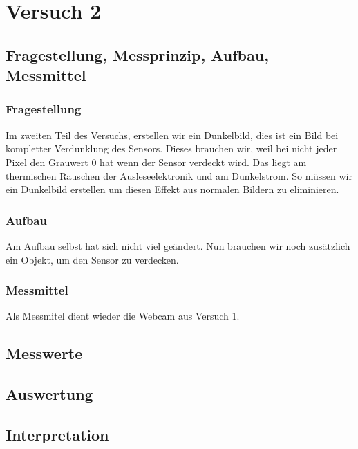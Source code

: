 \documentclass[TGAI_Laborbericht.tex]{subfiles}
\begin{document}
\chapter{Versuch 2}
\label{chap:VERSUCH_2}


\section{Fragestellung, Messprinzip, Aufbau, Messmittel}
\label{chap:VERSUCH_2_FRAGESTELLUNG}
\subsection{Fragestellung}

Im zweiten Teil des Versuchs, erstellen wir ein Dunkelbild, dies ist ein Bild bei kompletter Verdunklung des Sensors. Dieses brauchen wir, weil bei nicht jeder Pixel den Grauwert 0 hat wenn der Sensor verdeckt wird. Das liegt am thermischen Rauschen der Ausleseelektronik und am Dunkelstrom. So müssen wir ein Dunkelbild erstellen um diesen Effekt aus normalen Bildern zu eliminieren.


\subsection{Aufbau}

Am Aufbau selbst hat sich nicht viel geändert. Nun brauchen wir noch zusätzlich ein Objekt, um den Sensor zu verdecken.

\subsection{Messmittel}

Als Messmitel dient wieder die Webcam aus Versuch 1.

\section{Messwerte}
\label{chap:VERSUCH_2_MESSWERTE}

\section{Auswertung}
\label{chap:VERSUCH_2_AUSWERTUNG}

\section{Interpretation}
\label{chap:VERSUCH_2_INTERPRETATION}
\end{document}
